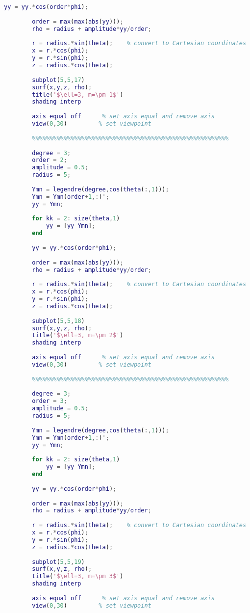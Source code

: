 \begin{lstlisting}[language=MATLAB]
		yy = yy.*cos(order*phi);
		
		order = max(max(abs(yy)));
		rho = radius + amplitude*yy/order;
		
		r = radius.*sin(theta);    % convert to Cartesian coordinates
		x = r.*cos(phi);
		y = r.*sin(phi);
		z = radius.*cos(theta);
		
		subplot(5,5,17)
		surf(x,y,z, rho);
		title('$\ell=3, m=\pm 1$')
		shading interp
		
		axis equal off      % set axis equal and remove axis
		view(0,30)         % set viewpoint
		
		%%%%%%%%%%%%%%%%%%%%%%%%%%%%%%%%%%%%%%%%%%%%%%%%%%%%%%%%
		
		degree = 3;
		order = 2;
		amplitude = 0.5;
		radius = 5;
		
		Ymn = legendre(degree,cos(theta(:,1)));
		Ymn = Ymn(order+1,:)';
		yy = Ymn;
		
		for kk = 2: size(theta,1)
		    yy = [yy Ymn];
		end
		
		yy = yy.*cos(order*phi);
		
		order = max(max(abs(yy)));
		rho = radius + amplitude*yy/order;
		
		r = radius.*sin(theta);    % convert to Cartesian coordinates
		x = r.*cos(phi);
		y = r.*sin(phi);
		z = radius.*cos(theta);
		
		subplot(5,5,18)
		surf(x,y,z, rho);
		title('$\ell=3, m=\pm 2$')
		shading interp
		
		axis equal off      % set axis equal and remove axis
		view(0,30)         % set viewpoint
		
		%%%%%%%%%%%%%%%%%%%%%%%%%%%%%%%%%%%%%%%%%%%%%%%%%%%%%%%%
		
		degree = 3;
		order = 3;
		amplitude = 0.5;
		radius = 5;
		
		Ymn = legendre(degree,cos(theta(:,1)));
		Ymn = Ymn(order+1,:)';
		yy = Ymn;
		
		for kk = 2: size(theta,1)
		    yy = [yy Ymn];
		end
		
		yy = yy.*cos(order*phi);
		
		order = max(max(abs(yy)));
		rho = radius + amplitude*yy/order;
		
		r = radius.*sin(theta);    % convert to Cartesian coordinates
		x = r.*cos(phi);
		y = r.*sin(phi);
		z = radius.*cos(theta);
		
		subplot(5,5,19)
		surf(x,y,z, rho);
		title('$\ell=3, m=\pm 3$')
		shading interp
		
		axis equal off      % set axis equal and remove axis
		view(0,30)         % set viewpoint
		

\end{lstlisting}
